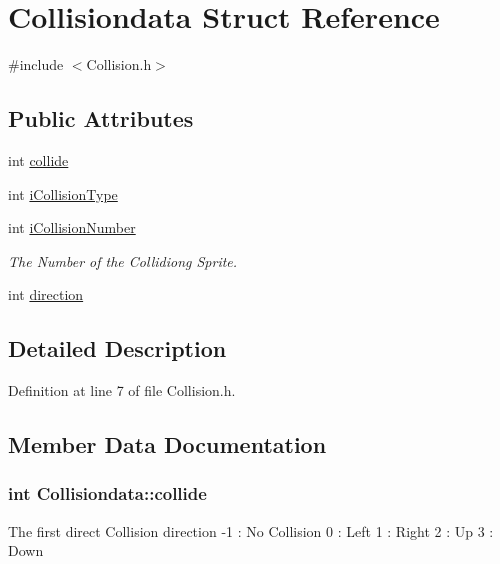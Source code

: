 \hypertarget{struct_collisiondata}{\section{Collisiondata Struct Reference}
\label{struct_collisiondata}
}


{\ttfamily \#include $<$Collision.\-h$>$}

\subsection*{Public Attributes}
\begin{DoxyCompactItemize}
\item 
int \hyperlink{struct_collisiondata_a6d8ba7d2f30580463aba232867ea9c11}{collide}
\item 
int \hyperlink{struct_collisiondata_a7b1299fc0c8589d2e4c3b64e29e9f722}{i\-Collision\-Type}
\item 
int \hyperlink{struct_collisiondata_ac5b2f3eb131fb4ba3dc8d2cfaed65006}{i\-Collision\-Number}
\begin{DoxyCompactList}\small\item\em The Number of the Collidiong Sprite. \end{DoxyCompactList}\item 
int \hyperlink{struct_collisiondata_a9d98f1b596ad915987b73710ea9a55ff}{direction}
\end{DoxyCompactItemize}


\subsection{Detailed Description}


Definition at line 7 of file Collision.\-h.



\subsection{Member Data Documentation}
\hypertarget{struct_collisiondata_a6d8ba7d2f30580463aba232867ea9c11}{
\subsubsection[{collide}]{\setlength{\rightskip}{0pt plus 5cm}int Collisiondata\-::collide}}\label{struct_collisiondata_a6d8ba7d2f30580463aba232867ea9c11}
The first direct Collision direction -\/1 \-: No Collision 0 \-: Left 1 \-: Right 2 \-: Up 3 \-: Down 

